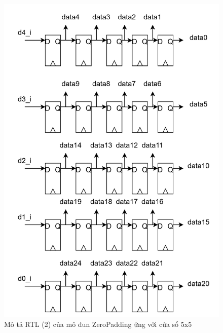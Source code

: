 \begin{figure}[H]
    \centering
    \includegraphics[width=\linewidth]{figures/zero5x5Architecture2.png}
    \caption{Mô tả RTL (2) của mô đun ZeroPadding ứng với cửa sổ 5x5}
    \label{fig:zero5x5Architecture2}
\end{figure}
